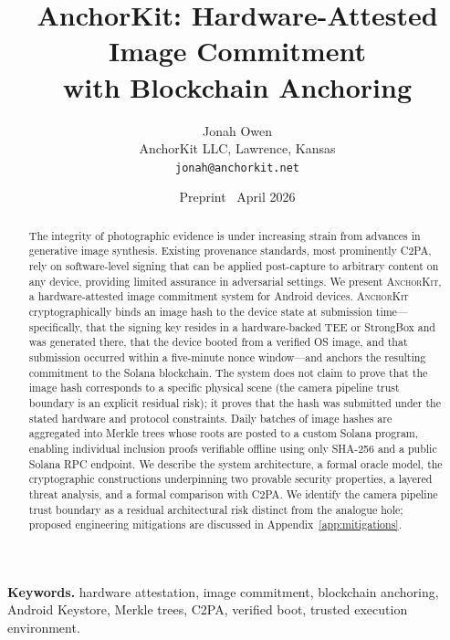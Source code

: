 \documentclass[11pt,a4paper]{article}
\newcommand{\AK}{\textsc{AnchorKit}\xspace}
\begin{document}
\title{\textbf{AnchorKit: Hardware-Attested Image Commitment\\[4pt]
       with Blockchain Anchoring}}
\author{Jonah Owen\\[2pt]
        \small AnchorKit LLC, Lawrence, Kansas\\[1pt]
        \small \texttt{jonah@anchorkit.net}}
\date{Preprint \textemdash\ April 2026}
\maketitle

\begin{abstract}
The integrity of photographic evidence is under increasing strain from advances
in generative image synthesis.  Existing provenance standards, most prominently
C2PA, rely on software-level signing that can be applied post-capture to
arbitrary content on any device, providing limited assurance in adversarial
settings.  We present \AK, a hardware-attested image commitment system for
Android devices.  \AK cryptographically binds an image hash to the device state
at submission time---specifically, that the signing key resides in a
hardware-backed TEE or StrongBox and was generated there, that the device booted
from a verified OS image, and that submission occurred within a five-minute nonce
window---and anchors the resulting commitment to the Solana blockchain.  The
system does not claim to prove that the image hash corresponds to a specific
physical scene (the camera pipeline trust boundary is an explicit residual risk);
it proves that the hash was submitted under the stated hardware and protocol
constraints.  Daily batches of image hashes are aggregated into Merkle trees
whose roots are posted to a custom Solana program, enabling individual
inclusion proofs verifiable offline using only SHA-256 and a public Solana RPC
endpoint.  We describe the system architecture, a formal oracle model, the
cryptographic constructions underpinning two provable security properties, a
layered threat analysis, and a formal comparison with C2PA\@.  We identify the
camera pipeline trust boundary as a residual architectural risk distinct from the
analogue hole; proposed engineering mitigations are discussed in
Appendix~\ref{app:mitigations}.
\end{abstract}

\medskip
\noindent\textbf{Keywords.} hardware attestation, image commitment, blockchain
anchoring, Android Keystore, Merkle trees, C2PA, verified boot, trusted
execution environment.
\end{document}
